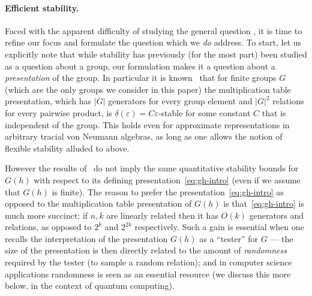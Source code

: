 \documentclass[11pt]{article}
\theoremstyle{definition}
\newcommand{\eps}{\varepsilon}
\begin{document}
\paragraph{Efficient stability.}
Faced with the apparent difficulty of studying the general question , it is time to refine our focus and formulate the question which we \emph{do} address. To start, let us explicitly note that 
while stability has previously (for the most part) been studied as a question about a group, our formulation makes it a question about a \emph{presentation} of the group. In particular it is known~\cite{gowers2017inverse,de2019operator} that for finite groups $G$ (which are the only groups we consider in this paper) the multiplication table presentation, which has $|G|$ generators for every group element and $|G|^2$ relations for every pairwise product, is $\delta(\eps)=C\eps$-stable   for some constant $C$ that is independent of the group. This holds even for approximate representations in arbitrary tracial von Neumann algebras, as long as one allows the notion of flexible stability alluded to above. 

However the results of~\cite{gowers2017inverse,de2019operator} do not imply the same quantitative stability bounds for $G(h)$ with respect to its defining presentation~\eqref{eq:gh-intro} (even if we assume that $G(h)$ is finite). The reason to prefer the presentation~\eqref{eq:gh-intro} as opposed to the multiplication table presentation of $G(h)$ is that~\eqref{eq:gh-intro} is much more succinct: if $n,k$ are linearly related then it has $O(k)$ generators and relations, as opposed to $2^k$ and $2^{2k}$ respectively. Such a gain is essential when one recalls the interpretation of the presentation $G(h)$ as a ``tester'' for $G$ --- the size of the presentation is then directly related to the amount of \emph{randomness} required by the tester (to sample a random relation); and in computer science applications randomness is seen as an essential resource (we discuss this more below, in the context of quantum computing). 
\end{document}
